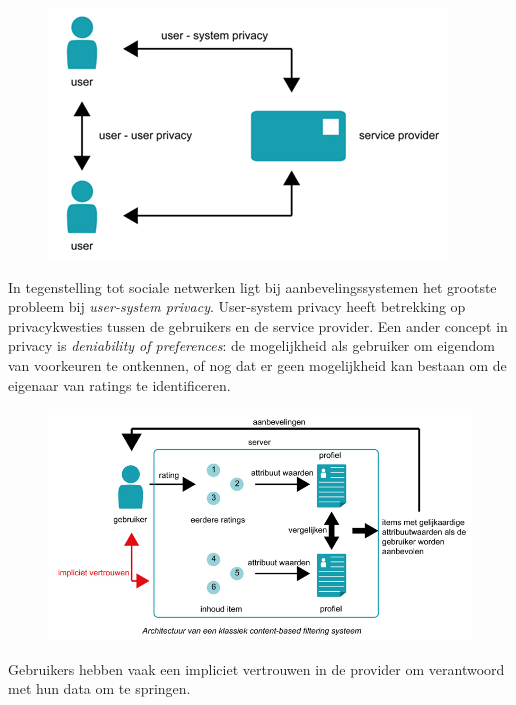 \begin{figure}[htpb]   
    \label{Figuur::usersystemprivacy}      
  \begin{center}    
 \includegraphics[scale=0.6,keepaspectratio]{fig/user-user-system-privacy}    
  \end{center}     
   \end{figure}
   
In tegenstelling tot sociale netwerken ligt bij aanbevelingssystemen het grootste probleem bij \textit{user-system privacy}. User-system privacy heeft betrekking op privacykwesties tussen de gebruikers en de service provider. Een ander concept in privacy is \emph{deniability of preferences}: de mogelijkheid als gebruiker om eigendom van voorkeuren te ontkennen, of nog dat er geen mogelijkheid kan bestaan om de eigenaar van ratings te identificeren.

\begin{figure}[htpb]   
    \label{Figuur::randomisatie}      
  \begin{center}    
 \includegraphics[scale=0.5]{fig/klassiek_systeem}    
  \end{center}   
   
   \end{figure}
Gebruikers hebben vaak een impliciet vertrouwen in de provider om verantwoord met hun data om te springen. 

